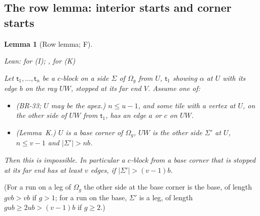 \documentclass[11pt,reqno]{amsart}
\theoremstyle{plain}
\newtheorem{lemma}[theorem]{Lemma}
\theoremstyle{definition}
\newcommand{\sF}{\textup{\textsf{F}}}
\begin{document}
\subsection{The row lemma: interior starts and corner starts}\label{sub:rows}
\begin{lemma}[Row lemma; \sF]\label{lem:rows}
{\small\noindent\emph{Lean:}  for \textup{(I)}; ,  for \textup{(K)}\par}
Let $\mathsf t_1,\dots,\mathsf t_n$ be a $c$-block on a side $\Sigma$ of $\Omega_{g}$ from $U$, $\mathsf t_1$ showing $\alpha$ at $U$ with its edge $b$ on the ray $UW$, stopped at its far end $V$. Assume one of:
\begin{itemize}
\item[\textup{(I)}] (BR-33; $U$ may be the apex.) $n\le u-1$, and some tile with a vertex at $U$, on the other side of $UW$ from $\mathsf t_1$, has an edge $a$ or $c$ on $UW$.
\item[\textup{(K)}] (Lemma~K.) $U$ is a base corner of $\Omega_{g}$, $UW$ is the other side $\Sigma'$ at $U$, $n\le v-1$ and $|\Sigma'|>nb$.
\end{itemize}
Then this is impossible. In particular a $c$-block from a base corner that is stopped at its far end has at least $v$ edges, if $|\Sigma'|>(v-1)b$.
\end{lemma}
(For a run on a leg of $\Omega_{g}$ the other side at the base corner is the base, of length $gvb>vb$ if $g>1$; for a run on the base, $\Sigma'$ is a leg, of length $gub\ge2ub>(v-1)b$ if $g\ge2$.)
\end{document}
